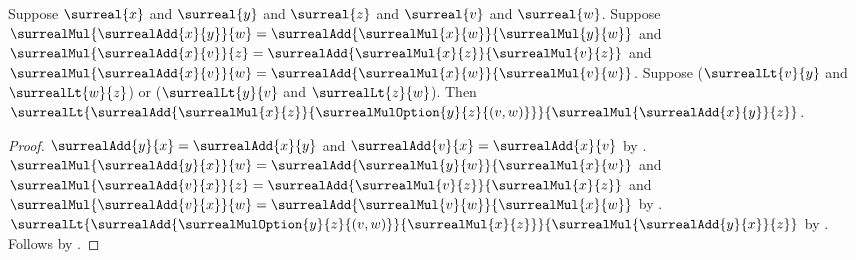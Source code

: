 \begin{lemma}\label{surreal_distributive_option_lt_same_right}
    Suppose $\surreal{x}$ and $\surreal{y}$ and $\surreal{z}$ and
        $\surreal{v}$ and $\surreal{w}$.
    Suppose
        $\surrealMul{\surrealAdd{x}{y}}{w}
            =\surrealAdd{\surrealMul{x}{w}}{\surrealMul{y}{w}}$ and
        $\surrealMul{\surrealAdd{x}{v}}{z}
            =\surrealAdd{\surrealMul{x}{z}}{\surrealMul{v}{z}}$ and
        $\surrealMul{\surrealAdd{x}{v}}{w}
            =\surrealAdd{\surrealMul{x}{w}}{\surrealMul{v}{w}}$.
    Suppose
        ($\surrealLt{v}{y}$ and $\surrealLt{w}{z}$) or
        ($\surrealLt{y}{v}$ and $\surrealLt{z}{w}$).
    Then
        $\surrealLt
            {\surrealAdd{\surrealMul{x}{z}}
                {\surrealMulOption{y}{z}{(v,w)}}}
            {\surrealMul{\surrealAdd{x}{y}}{z}}$.
\end{lemma}
\begin{proof}
    $\surrealAdd{y}{x}=\surrealAdd{x}{y}$ and
        $\surrealAdd{v}{x}=\surrealAdd{x}{v}$
        by .
    $\surrealMul{\surrealAdd{y}{x}}{w}
        =\surrealAdd{\surrealMul{y}{w}}{\surrealMul{x}{w}}$ and
        $\surrealMul{\surrealAdd{v}{x}}{z}
        =\surrealAdd{\surrealMul{v}{z}}{\surrealMul{x}{z}}$ and
        $\surrealMul{\surrealAdd{v}{x}}{w}
        =\surrealAdd{\surrealMul{v}{w}}{\surrealMul{x}{w}}$
        by .
    $\surrealLt
        {\surrealAdd{\surrealMulOption{y}{z}{(v,w)}}
            {\surrealMul{x}{z}}}
        {\surrealMul{\surrealAdd{y}{x}}{z}}$
        by .
    Follows by
        .
\end{proof}

